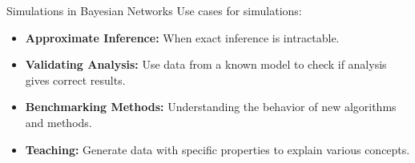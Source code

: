 \documentclass{beamer}
\begin{document}

\begin{frame}{Simulations in Bayesian Networks}
	Use cases for simulations:
	\vspace{2em}
	\begin{itemize}
		\setlength\itemsep{1em}
		\item \textbf{Approximate Inference:} When exact inference is intractable.
		\item \textbf{Validating Analysis:} Use data from a known model to check if analysis gives correct results.
		\item \textbf{Benchmarking Methods:} Understanding the behavior of new algorithms and methods.
		\item \textbf{Teaching:} Generate data with specific properties to explain various concepts.
	\end{itemize}
\end{frame}
\end{document}
